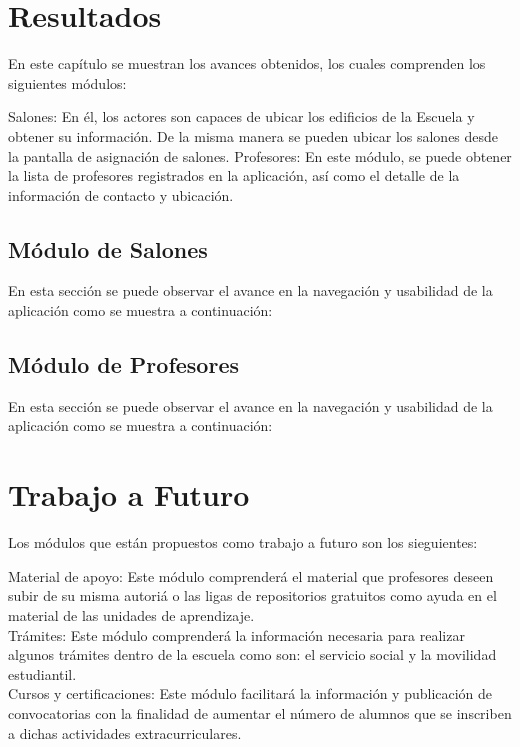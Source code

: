 \section{Resultados}

En este capítulo se muestran los avances obtenidos, los cuales comprenden los siguientes módulos:\\

\begin{UClist} 
	\UCli Salones: En él, los actores son capaces de ubicar los edificios de la Escuela y obtener su información. De la misma manera se pueden ubicar los salones desde la pantalla de asignación de salones.
	\UCli Profesores: En este módulo, se puede obtener la lista de profesores registrados en la aplicación, así como el detalle de la información de contacto y ubicación.
\end{UClist} 

\subsection{Módulo de Salones}

En esta sección se puede observar el avance en la navegación y usabilidad de la aplicación como se muestra a continuación:


\subsection{Módulo de Profesores}

En esta sección se puede observar el avance en la navegación y usabilidad de la aplicación como se muestra a continuación:


\section{Trabajo a Futuro}

Los módulos que están propuestos como trabajo a futuro son los sieguientes: \\

\begin{UClist} 
	\UCli Material de apoyo: 
	Este módulo comprenderá el material que profesores deseen subir de su misma autoriá o las ligas de repositorios gratuitos como ayuda en el material de las unidades de aprendizaje.\\
	
	\UCli Trámites: 
	Este módulo comprenderá la información necesaria para realizar algunos trámites dentro de la escuela como son: el servicio social y la movilidad estudiantil.\\
	
	\UCli Cursos y certificaciones: 
	Este módulo facilitará la información y publicación de convocatorias con la finalidad de aumentar el número de alumnos que se inscriben a dichas actividades extracurriculares.\\
\end{UClist} 

